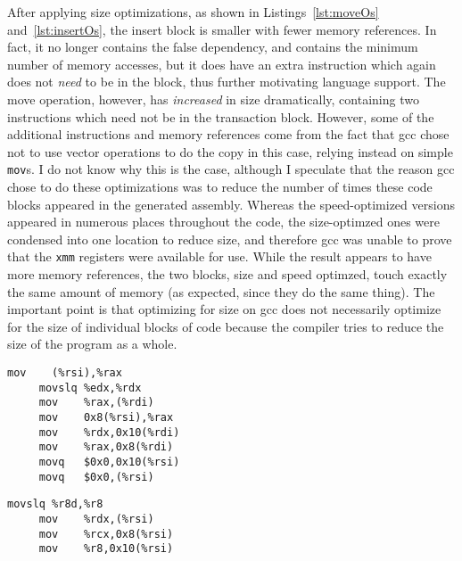After applying size optimizations, as shown in Listings~\ref{lst:moveOs}
and~\ref{lst:insertOs}, the insert block is smaller with fewer memory
references. In fact, it no longer contains the false dependency, and contains
the minimum number of memory accesses, but it does have
an extra instruction which again does not \textit{need} to be in the block, thus
further motivating language support. The move operation, however, has
\textit{increased} in size dramatically, containing two instructions which need
not be in the transaction block. However, some of the additional instructions
and memory references come from the fact that gcc chose not to use vector
operations to do the copy in this case, relying instead on simple \texttt{mov}s.
I do not know why this is the case, although I speculate that the reason gcc
chose to do these optimizations was to reduce the number of times these code
blocks appeared in the generated assembly. Whereas the speed-optimized versions
appeared in numerous places throughout the code, the size-optimzed ones were
condensed into one location to reduce size, and therefore gcc was unable to
prove that the \texttt{xmm} registers were available for use. While the result
appears to have more memory references, the two blocks, size and speed optimzed,
touch exactly the same amount of memory (as expected, since they do the same thing).
The important point is that optimizing for size on gcc does not necessarily
optimize for the size of individual blocks of code because the compiler tries to
reduce the size of the program as a whole.




\begin{lstlisting}[caption={Transaction code, do\_move, optimized for size.
Eight instructions, seven memory accesses (five writes).},label=lst:moveOs]
     mov    (%rsi),%rax
     movslq %edx,%rdx
     mov    %rax,(%rdi)
     mov    0x8(%rsi),%rax
     mov    %rdx,0x10(%rdi)
     mov    %rax,0x8(%rdi)
     movq   $0x0,0x10(%rsi)
     movq   $0x0,(%rsi)
\end{lstlisting}

\begin{lstlisting}[caption={Transaction code, do\_insert, optimized for size.
Four instructions, three memory accesses (three writes).},label=lst:insertOs]
     movslq %r8d,%r8
     mov    %rdx,(%rsi)
     mov    %rcx,0x8(%rsi)
     mov    %r8,0x10(%rsi)
\end{lstlisting}



